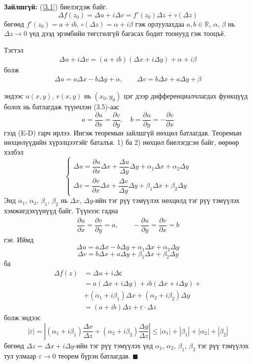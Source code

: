 \begin{prf}
\textbf{Зайлшгүй:} (\ref{3.1}) биелэгдэж байг. 
$$\Delta f(z_0)=\Delta u+i\Delta v=f'(z_0)\Delta z+\circ (\Delta z)$$ бөгөөд $f'(z_0)=a+ib$, $\circ (\Delta z)= \alpha +i\beta$ гэж орлуулахдаа $a,b\in\mathbb{R}$, $\alpha$, $\beta$ нь $\Delta z\rightarrow 0$ үед дээд эрэмбийн төгсгөлгүй багасах бодит тоонууд гэж тооцъё.

Тэгтэл 
\begin{eqnarray}
 \Delta u+i \Delta v=(a+ib) (\Delta x+i\Delta y)+\alpha +i\beta
\end{eqnarray} болж 
\begin{eqnarray}
 \Delta u=a \Delta x-b\Delta y+\alpha, \qquad \Delta v=b\Delta x+a\Delta y +\beta
\end{eqnarray}

эндээс $u(x,y)$, $v(x,y)$ нь $(x_0,y_0)$ цэг дээр дифференциалчлагдах функцүүд болох нь батлагдаж түүнчлэн (3.5)-аас
$$a=\dfrac{\partial u}{\partial x}=\dfrac{\partial v}{\partial y}, \quad b=\dfrac{\partial u}{\partial y}=-\dfrac{\partial v}{\partial x}$$
гээд (E-D) гарч ирлээ. Ингэж теоремын зайлшгүй нөхцөл батлагдав. Теоремын нөхцөлүүдийн хүрэлцээтэйг баталъя.
1) ба 2) нөхцөл биелэгдсэн байг, өөрөөр хэлбэл
$$
\begin{cases}
\Delta  u=\dfrac{\partial u}{\partial x}\Delta x+\dfrac{\Delta u}{\Delta y}\Delta y+\alpha_1\Delta x+\alpha_2\Delta y\\
\Delta v=\dfrac{\partial v}{\partial x}\Delta x+\dfrac{\Delta v}{\Delta y}\Delta y+\beta_1\Delta x+\beta_2\Delta y
\end{cases}
$$ 
Энд $\alpha_1$, $\alpha_2$, $\beta_1$, $\beta_2$ нь $\Delta x$, $\Delta y$-ийн тэг рүү тэмүүлэх нөхцөлд тэг рүү тэмүүлэх хэмжигдэхүүнүүд байг. Түүнээс гадна
\begin{eqnarray}
 \dfrac{\partial u}{\partial x}=\dfrac{\partial v}{\partial y}=a, \qquad -\dfrac{\partial u}{\partial y}=\dfrac{\partial v}{\partial x}=b
\end{eqnarray}
гэе. Иймд
$$\Delta u=a\Delta x-b\Delta y+\alpha_1\Delta x+\alpha_2\Delta y$$
$$\Delta v=b\Delta x+a\Delta y+\beta_1\Delta x+\beta_2\Delta y$$ ба 
\begin{equation}
 \begin{split}
\Delta f(z)&=\Delta u+i\Delta с \\
&=a(\Delta x+i\Delta y)+ib(\Delta x+i\Delta y)+\\
&+(\alpha_1+i\beta_1)\Delta x+(\alpha_2+i\beta_2)\Delta y \\
&=(a+ib) \Delta z+\varepsilon \cdot \Delta z
 \end{split}  
\end{equation}
 болж эндээс 
$$|\varepsilon| =\left|(\alpha_1+i\beta_1)\frac{\Delta x}{\Delta z}+(\alpha_2+i\beta_2)\frac{\Delta y }{\Delta z}\right|\leq |\alpha_1|+|\beta_1|+|\alpha_2|+|\beta_2|$$ бөгөөд  $\Delta z=\Delta x+i\Delta y$-ийн тэг рүү тэмүүлэх үед $\alpha_1$, $\alpha_2$, $\beta_1$, $\beta_2$ тэг рүү тэмүүлэх тул улмаар $\varepsilon\rightarrow 0$ теорем бүрэн батлагдав.
\hfill $\blacksquare$\end{prf}
